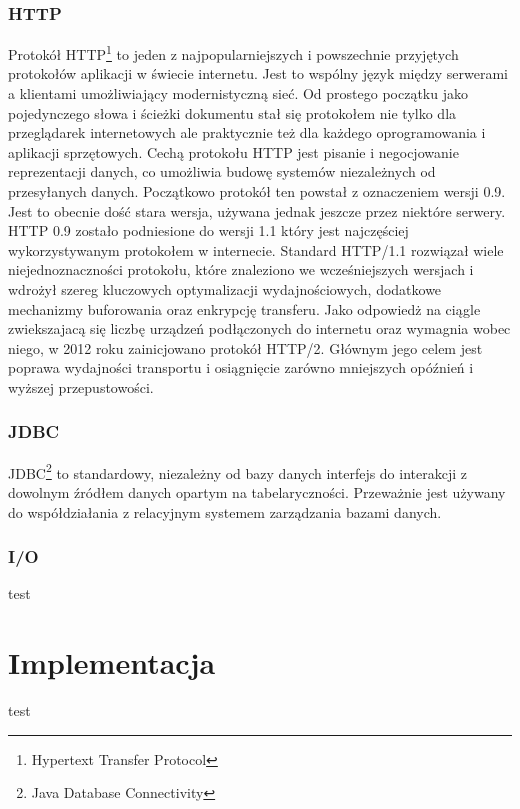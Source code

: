 \documentclass[12pt, twoside]{report}
\begin{document}
\subsection{HTTP}
Protokół HTTP\footnote{Hypertext Transfer Protocol} to jeden z najpopularniejszych i powszechnie przyjętych protokołów aplikacji w świecie internetu. Jest to wspólny język między serwerami a klientami umożliwiający modernistyczną sieć. Od prostego początku jako pojedynczego słowa i ścieżki dokumentu stał się protokołem nie tylko dla przeglądarek internetowych ale praktycznie też dla każdego oprogramowania i aplikacji sprzętowych\cite{http}. Cechą protokołu HTTP jest pisanie i negocjowanie reprezentacji danych, co umożliwia budowę systemów niezależnych od przesyłanych danych.
 Początkowo protokół ten powstał z oznaczeniem wersji 0.9. Jest to obecnie dość stara wersja, używana jednak jeszcze przez niektóre serwery. HTTP 0.9 zostało podniesione do wersji 1.1 który jest najczęściej wykorzystywanym protokołem w internecie. Standard HTTP/1.1 rozwiązał wiele niejednoznaczności protokołu, które znaleziono we wcześniejszych wersjach i wdrożył szereg kluczowych optymalizacji wydajnościowych, dodatkowe mechanizmy buforowania oraz enkrypcję transferu. Jako odpowiedż na ciągle zwiekszajacą się liczbę urządzeń podłączonych do internetu oraz wymagnia wobec niego, w 2012 roku zainicjowano protokół HTTP/2. Głównym jego celem jest poprawa wydajności transportu i osiągnięcie zarówno mniejszych opóźnień i wyższej przepustowości.
\subsection{JDBC}
JDBC\footnote{Java Database Connectivity} to standardowy, niezależny od bazy danych interfejs do interakcji z dowolnym źródłem danych opartym na tabelaryczności. Przeważnie jest używany do współdziałania z relacyjnym systemem zarządzania bazami danych.
\subsection{I/O}
test

\newpage
\chapter{Implementacja}
test
\newpage
\end{document}
